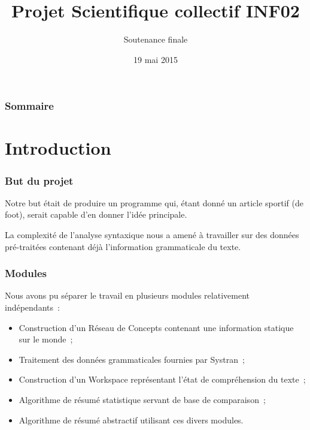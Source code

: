 \documentclass[12pt, handout]{beamer}
\title{Projet Scientifique collectif INF02}
\subtitle{Soutenance finale}
\author{}
\date{19 mai 2015}
\begin{document}

    \begin{frame}
      \maketitle
    \end{frame}		


    \begin{frame}
      \frametitle{Sommaire}
      \tableofcontents
    \end{frame}

\section{Introduction}

\begin{frame}
 \frametitle{But du projet}
 Notre but était de produire un programme qui, étant donné un article sportif (de foot), serait capable d'en donner l'idée principale.
 
 La complexité de l'analyse syntaxique nous a amené à travailler sur des données pré-traitées contenant déjà l'information grammaticale du texte.

\end{frame}

\begin{frame}
 \frametitle{Modules}
 Nous avons pu séparer le travail en plusieurs modules relativement indépendants~:
 \begin{itemize}
  \item Construction d'un Réseau de Concepts contenant une information statique sur le monde~;
  \item Traitement des données grammaticales fournies par Systran~;
  \item Construction d'un Workspace représentant l'état de compréhension du texte~;
  \item Algorithme de résumé statistique servant de base de comparaison~;
  \item Algorithme de résumé abstractif utilisant ces divers modules.
 \end{itemize}
 
\end{frame}
\end{document}
